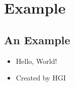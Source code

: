 \section{Example}

\subsection{An Example}

\begin{slide}
  \begin{itemize}
    \item<1->
      Hello, World!

    \item<2->
      Created by HGI \cite{harrison15}
  \end{itemize}
\end{slide}

